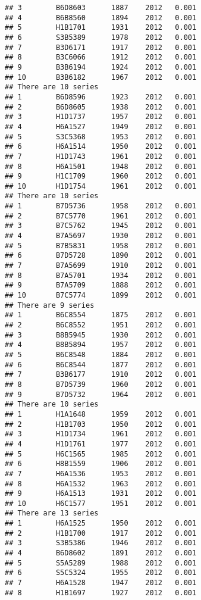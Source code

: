 \documentclass[]{article}
\begin{document}
\begin{verbatim}
## 3        B6D8603      1887    2012   0.001
## 4        B6B8560      1894    2012   0.001
## 5        H1B1701      1931    2012   0.001
## 6        S3B5389      1978    2012   0.001
## 7        B3D6171      1917    2012   0.001
## 8        B3C6066      1912    2012   0.001
## 9        B3B6194      1924    2012   0.001
## 10       B3B6182      1967    2012   0.001
## There are 10 series
## 1        B6D8596      1923    2012   0.001
## 2        B6D8605      1938    2012   0.001
## 3        H1D1737      1957    2012   0.001
## 4        H6A1527      1949    2012   0.001
## 5        S3C5368      1953    2012   0.001
## 6        H6A1514      1950    2012   0.001
## 7        H1D1743      1961    2012   0.001
## 8        H6A1501      1948    2012   0.001
## 9        H1C1709      1960    2012   0.001
## 10       H1D1754      1961    2012   0.001
## There are 10 series
## 1        B7D5736      1958    2012   0.001
## 2        B7C5770      1961    2012   0.001
## 3        B7C5762      1945    2012   0.001
## 4        B7A5697      1930    2012   0.001
## 5        B7B5831      1958    2012   0.001
## 6        B7D5728      1890    2012   0.001
## 7        B7A5699      1910    2012   0.001
## 8        B7A5701      1934    2012   0.001
## 9        B7A5709      1888    2012   0.001
## 10       B7C5774      1899    2012   0.001
## There are 9 series
## 1        B6C8554      1875    2012   0.001
## 2        B6C8552      1951    2012   0.001
## 3        B8B5945      1930    2012   0.001
## 4        B8B5894      1957    2012   0.001
## 5        B6C8548      1884    2012   0.001
## 6        B6C8544      1877    2012   0.001
## 7        B3B6177      1910    2012   0.001
## 8        B7D5739      1960    2012   0.001
## 9        B7D5732      1964    2012   0.001
## There are 10 series
## 1        H1A1648      1959    2012   0.001
## 2        H1B1703      1950    2012   0.001
## 3        H1D1734      1961    2012   0.001
## 4        H1D1761      1977    2012   0.001
## 5        H6C1565      1985    2012   0.001
## 6        H8B1559      1906    2012   0.001
## 7        H6A1536      1953    2012   0.001
## 8        H6A1532      1963    2012   0.001
## 9        H6A1513      1931    2012   0.001
## 10       H6C1577      1951    2012   0.001
## There are 13 series
## 1        H6A1525      1950    2012   0.001
## 2        H1B1700      1917    2012   0.001
## 3        S3B5386      1946    2012   0.001
## 4        B6D8602      1891    2012   0.001
## 5        S5A5289      1988    2012   0.001
## 6        S5C5324      1955    2012   0.001
## 7        H6A1528      1947    2012   0.001
## 8        H1B1697      1927    2012   0.001

\end{verbatim}
\end{document}
